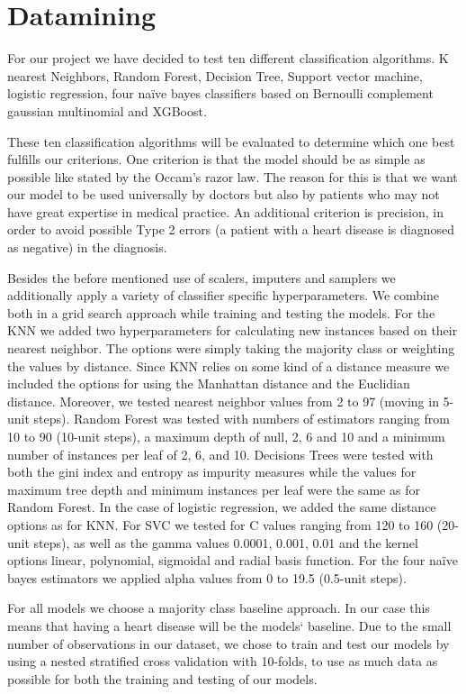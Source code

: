 \section{Datamining} \label{sec:datamining}

For our project we have decided to test ten different classification algorithms. K nearest Neighbors, Random Forest, Decision Tree, Support vector machine, logistic regression, four naïve bayes classifiers based on Bernoulli complement gaussian multinomial and XGBoost. 

These ten classification algorithms will be evaluated to determine which one best fulfills our criterions. One criterion is that the model should be as simple as possible like stated by the Occam’s razor law. The reason for this is that we want our model to be used universally by doctors but also by patients who may not have great expertise in medical practice. An additional criterion is precision, in order to avoid possible Type 2 errors (a patient with a heart disease is diagnosed as negative) in the diagnosis.   

Besides the before mentioned use of scalers, imputers and samplers we additionally apply a variety of classifier specific hyperparameters. We combine both in a grid search approach while training and testing the models. For the KNN we added two hyperparameters for calculating new instances based on their nearest neighbor. The options were simply taking the majority class or weighting the values by distance. Since KNN relies on some kind of a distance measure we included the options for using the Manhattan distance and the Euclidian distance. Moreover, we tested nearest neighbor values from 2 to 97 (moving in 5-unit steps). Random Forest was tested with numbers of estimators ranging from 10 to 90 (10-unit steps), a maximum depth of null, 2, 6 and 10 and a minimum number of instances per leaf of 2, 6, and 10. Decisions Trees were tested with both the gini index and entropy as impurity measures while the values for maximum tree depth and minimum instances per leaf were the same as for Random Forest. In the case of logistic regression, we added the same distance options as for KNN. For SVC we tested for C values ranging from 120 to 160 (20-unit steps), as well as the gamma values 0.0001, 0.001, 0.01 and the kernel options linear, polynomial, sigmoidal and radial basis function. For the four naïve bayes estimators we applied alpha values from 0 to 19.5 (0.5-unit steps). 

For all models we choose a majority class baseline approach. In our case this means that having a heart disease will be the models` baseline. Due to the small number of observations in our dataset, we chose to train and test our models by using a nested stratified cross validation with 10-folds, to use as much data as possible for both the training and testing of our models. 

